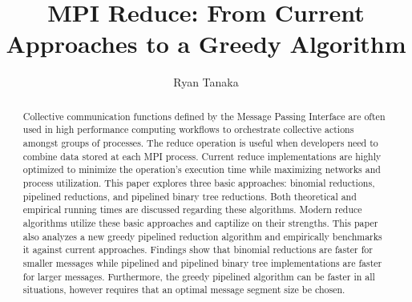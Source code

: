 \documentclass{article}
\begin{document}
\title{MPI Reduce: From Current Approaches to a Greedy Algorithm}
\author{Ryan Tanaka}

\maketitle

\begin{abstract}
Collective communication functions defined by the Message Passing Interface are often used in high 
performance computing workflows to orchestrate collective actions amongst groups of processes.
The reduce operation is useful when developers need to combine data stored at each MPI process. 
Current reduce implementations are highly optimized to minimize the operation's execution time 
while maximizing networks and process utilization. This paper explores three basic approaches: 
binomial reductions, pipelined reductions, and pipelined binary tree reductions. Both theoretical 
and empirical running times are discussed regarding these algorithms. Modern reduce algorithms 
utilize these basic approaches and captilize on their strengths. This paper also analyzes a new 
greedy pipelined reduction algorithm and empirically benchmarks it against current approaches. 
Findings show that binomial reductions are faster for smaller messages while pipelined and pipelined
binary tree implementations are faster for larger messages. Furthermore, the greedy pipelined 
algorithm can be faster in all situations, however requires that an optimal message segment size
be chosen.
\end{abstract}
\end{document}
